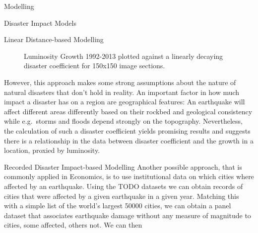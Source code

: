 \documentclass[12pt,fleqn,leqno,letterpaper]{article}
\begin{document}
\begin{section}{Modelling}
\begin{subsection}{Disaster Impact Models}
\begin{subsubsection}{Linear Distance-based Modelling}
\begin{figure}
        \caption{Luminosity Growth 1992-2013 plotted against a linearly decaying disaster coefficient for 150x150 image sections.}
      \end{figure}
      However, this approach makes some strong assumptions about the nature of natural disasters that don't hold in reality. An important factor in how much impact a disaster has on a region are geographical features: An earthquake will affect different areas differently based on their rockbed and geological consistency while e.g.\ storms and floods depend strongly on the topography. Nevertheless, the calculation of such a disaster coefficient yields promising results and suggests there is a relationship in the data between disaster coefficient and the growth in a location, proxied by luminosity.
    \end{subsubsection}
    \begin{subsubsection}{Recorded Disaster Impact-based Modelling}
      Another possible approach, that is commonly applied in Economics, is to use institutional data on which cities where affected by an earthquake. Using the TODO datasets we can obtain records of cities that were affected by a given earthquake in a given year. Matching this with a simple list of the world's largest 50000 cities, we can obtain a panel dataset that associates earthquake damage without any measure of magnitude to cities, some affected, others not.
      We can then 
    \end{subsubsection}
    \begin{figure}[t!]
      \centering

\end{figure}
\end{subsection}
\end{section}
\end{document}
